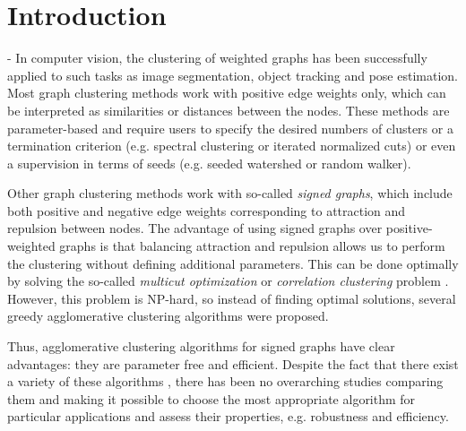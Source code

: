 
\section{Introduction}
\UPDATE{\today,\currenttime} -  In computer vision, the clustering of weighted graphs has been successfully applied to such tasks as image segmentation, object tracking and pose estimation. %
Most graph clustering methods work with positive edge weights only, which can be interpreted as similarities or distances between the nodes. These methods are parameter-based and require users to specify the desired numbers of clusters or a termination criterion (e.g. spectral clustering or iterated normalized cuts) or even a supervision in terms of seeds (e.g. seeded watershed or random walker).  

Other graph clustering methods work with so-called \emph{signed graphs}, which include both positive and negative edge weights corresponding to attraction and repulsion between nodes. The advantage of using signed graphs over positive-weighted graphs is that balancing attraction and repulsion allows us to perform the clustering without defining additional parameters. This can be done optimally by solving the so-called \emph{multicut optimization} or \emph{correlation clustering} problem \cite{kappes2011globally,chopra1991multiway}. However, this problem is NP-hard, so instead of finding optimal solutions, several greedy agglomerative clustering algorithms were proposed. 

Thus, agglomerative clustering algorithms for signed graphs have clear advantages: they are parameter free and efficient. Despite the fact that there exist a variety of these algorithms \cite{keuper2015efficient,levinkov2017comparative,wolf2018mutex,kardoostsolving}, there has been no overarching studies comparing them and making it possible to choose the most appropriate algorithm for particular applications and assess their properties, e.g. robustness and efficiency.


